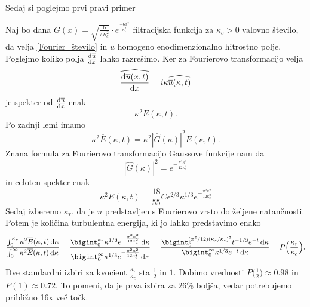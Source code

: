 \documentclass[mat2, tisk]{fmfdelo}
\begin{document}
Sedaj si poglejmo prvi pravi primer 
\begin{primer}
Naj bo dana $G(x) = \sqrt{\frac{6}{\pi \kappa_c^2}}\cdot e^\frac{-6x^2}{\kappa_c^2}$ filtracijska funkcija 
za $\kappa_c > 0$ valovno število, da velja \ref{Fourier_število} in $u$ homogeno enodimenzionalno hitrostno polje. Poglejmo koliko polja $\frac{\dif \overline{u}}{\dif x}$
lahko razrešimo. Ker za Fourierovo transformacijo velja
$$
\widehat{\frac{\dif \overline{u}(x, t)}{\dif x}} = i\kappa \widehat{\overline{u}(\kappa, t)}
$$
je spekter od $\frac{\dif \overline{u}}{\dif x}$ enak 
$$
\kappa^2 \overline{E}(\kappa, t).
$$
Po zadnji lemi imamo 
$$
\kappa^2 \overline{E}(\kappa, t) = \kappa^2 |\hat{G}(\kappa)|^2 E(\kappa, t).
$$
Znana formula za Fourierovo transformacijo Gaussove funkcije nam da
$$
|\hat{G}(\kappa)|^2 = e^{-\frac{\pi^2 \kappa^2}{12\kappa_c^2}}
$$
in celoten spekter enak 
$$
\kappa^2 \overline{E}(\kappa, t) = \frac{18}{55} C\epsilon^{2/3} \kappa^{1/3} e^{-\frac{\pi^2 \kappa^2}{12\kappa_c^2}}
$$
Sedaj izberemo $\kappa_r$, da je $u$ predstavljen s Fourierovo vrsto 
do željene natančnosti. Potem je količina turbulentna energija, ki jo lahko 
predstavimo enako 
\begin{align*}
\frac{\int_{0}^{\kappa_r} \kappa^2 \overline{E}(\kappa, t)\dif \kappa}{\int_{0}^{\infty} \kappa^2 \overline{E}(\kappa, t)\dif \kappa} = \frac{\bigint_0^{\kappa_r} \kappa^{1/3} e^{-\frac{\pi^2 \kappa^2}{12\kappa_c^2}}\dif \kappa}{\bigint_{0}^{\infty} \kappa^{1/3} e^{-\frac{\pi^2 \kappa^2}{12\kappa_c^2}}\dif \kappa} = 
\frac{\bigint_0^{(\pi^2/12)(\kappa_r/\kappa_c)^2} t^{-1/3} e^{-t}\dif \kappa}{\bigint_{0}^{\infty} \kappa^{1/3} e^{-t}\dif \kappa} = P\Big(\frac{\kappa_r}{\kappa_c}\Big).
\end{align*}
Dve standardni izbiri za kvocient $\frac{\kappa_r}{\kappa_c}$ sta $\frac{1}{2}$ in $1$.
Dobimo vrednosti $P\Big(\frac{1}{2}\Big) \approx 0.98$ in 
$P(1) \approx 0.72$. To pomeni, da je prva izbira za $26\%$ boljša, 
vedar potrebujemo približno 16x več točk.
\end{primer}
\end{document}
